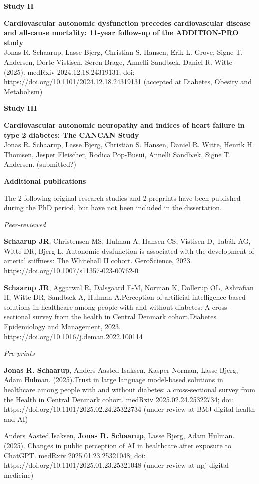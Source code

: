 \documentclass[
  letterpaper,
  headsepline=true,
  open=any]{scrbook}
\begin{document}
\textbf{Study II}

\textbf{Cardiovascular autonomic dysfunction precedes cardiovascular
disease and all-cause mortality: 11-year follow-up of the ADDITION-PRO
study}\\
Jonas R. Schaarup, Lasse Bjerg, Christian S. Hansen, Erik L. Grove,
Signe T. Andersen, Dorte Vistisen, Søren Brage, Annelli Sandbæk, Daniel
R. Witte (2025). medRxiv 2024.12.18.24319131; doi:
https://doi.org/10.1101/2024.12.18.24319131 (accepted at Diabetes,
Obesity and Metabolism)

\textbf{Study III}

\textbf{Cardiovascular autonomic neuropathy and indices of heart failure
in type 2 diabetes: The CANCAN Study}\\
Jonas R. Schaarup, Lasse Bjerg, Christian S. Hansen, Daniel R. Witte,
Henrik H. Thomsen, Jesper Fleischer, Rodica Pop-Busui, Annelli Sandbæk,
Signe T. Andersen. (submitted?)

\newpage

\textbf{Additional publications}

The 2 following original research studies and 2 preprints have been
published during the PhD period, but have not been included in the
dissertation.

\emph{Peer-reviewed}

\textbf{Schaarup JR}, Christensen MS, Hulman A, Hansen CS, Vistisen D,
Tabák AG, Witte DR, Bjerg L. Autonomic dysfunction is associated with
the development of arterial stiffness: The Whitehall II cohort.
GeroScience, 2023. https://doi.org/10.1007/s11357-023-00762-0

\textbf{Schaarup JR}, Aggarwal R, Dalsgaard E-M, Norman K, Dollerup OL,
Ashrafian H, Witte DR, Sandbæk A, Hulman A.Perception of artificial
intelligence-based solutions in healthcare among people with and without
diabetes: A cross-sectional survey from the health in Central Denmark
cohort.Diabetes Epidemiology and Management, 2023.
https://doi.org/10.1016/j.deman.2022.100114

\emph{Pre-prints}

\textbf{Jonas R. Schaarup}, Anders Aasted Isaksen, Kasper Norman, Lasse
Bjerg, Adam Hulman. (2025).Trust in large language model-based solutions
in healthcare among people with and without diabetes: a cross-sectional
survey from the Health in Central Denmark cohort. medRxiv
2025.02.24.25322734; doi: https://doi.org/10.1101/2025.02.24.25322734
(under review at BMJ digital health and AI)

Anders Aasted Isaksen, \textbf{Jonas R. Schaarup}, Lasse Bjerg, Adam
Hulman. (2025). Changes in public perception of AI in healthcare after
exposure to ChatGPT. medRxiv 2025.01.23.25321048; doi:
https://doi.org/10.1101/2025.01.23.25321048 (under review at npj digital
medicine)
\end{document}
